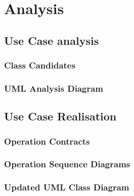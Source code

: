 \section{Analysis}
\subsection{Use Case analysis}
\subsubsection{Class Candidates}
\subsubsection{UML Analysis Diagram}
\subsection{Use Case Realisation}
\subsubsection{Operation Contracts}
\subsubsection{Operation Sequence Diagrams}
\subsubsection{Updated UML Class Diagram}
